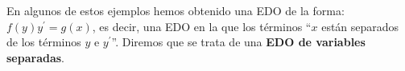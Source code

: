 En algunos de estos ejemplos hemos obtenido una EDO de la forma: $f(y)y^\prime = g(x)$, es decir, una EDO en la que los términos ``$x$ están separados de los términos $y$ e $y^\prime$''. Diremos que se trata de una \textbf{EDO de variables separadas}. 
